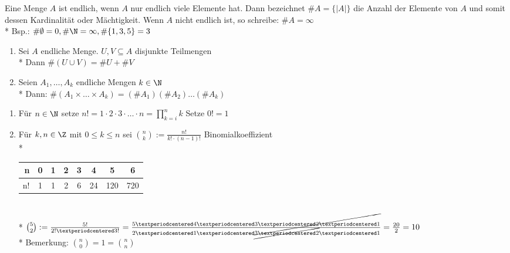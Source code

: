 Eine Menge $A$ ist endlich, wenn $A$ nur endlich viele Elemente hat. Dann bezeichnet
$\#A = \{|A|\}$ die Anzahl der Elemente von $A$ und somit dessen Kardinalität
oder Mächtigkeit. Wenn $A$ nicht endlich ist, so schreibe: $\# A= \infty$\\*
Bsp.: $\#\emptyset = 0, \#\N=\infty, \# \{1,3,5\} = 3$

\begin{enumerate}
\item Sei $A$ endliche Menge. $U,V\subseteq A$ disjunkte Teilmengen\\*
Dann $\#(U\cup V)=\# U + \# V$ 
\item Seien $A_1,…,A_k$ endliche Mengen $k \in \N$\\*
Dann: $\#(A_1 \times … \times A_k)=(\#A_1)(\#A_2)…(\#A_k)$
\end{enumerate}

\begin{enumerate}
\item Für $n\in \N$ setze $n!=1·2·3· … · n=\prod_{k=i}^n k$
Setze $0!=1$
\item Für $k,n\in \Z$ mit $0\le k \le n$ sei $\binom{n}{k}:= \frac{n!}{k!·(n-1)!}$ \Rarr{} Binomialkoeffizient\\*
\begin{tabular}{r|c|c|c|c|c|c|c}
n & 0 & 1 & 2 & 3 & 4 & 5 & 6\\* \hline
n! & 1 & 1 & 2 & 6 & 24 & 120 & 720
\end{tabular}\\*
\bsp
$\binom{5}{2} := \frac{5!}{2!· 3!} = \frac{5· 4 ·\cancel{3 · 2 · 1}}{2· 1· \cancel{3· 2}· 1 } = \frac{20}{2}=10$\\*
Bemerkung: $\binom{n}{0}= 1 = \binom{n}{n}$
\end{enumerate}